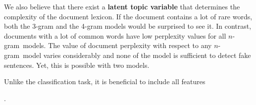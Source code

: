 \documentclass[11pt]{article}
\newcommand{\ngram}{\mbox{$n$-gram }}
\begin{document}
We also believe that there exist a \textbf{latent topic variable} that determines the complexity
of the document lexicon.
If the document contains a lot of rare words, both the 3-gram and the 4-gram models
would be surprised to see it. In contrast, documents with a lot of common words
have low perplexity values for all \ngram models.
The value of document perplexity with respect to any \ngram model varies considerably
and none of the model is sufficient to detect fake sentences.
Yet, this is possible with two models.

Unlike the classification task, it is beneficial to include all features 


\cite{jordan2002discriminative}.



\end{document}
